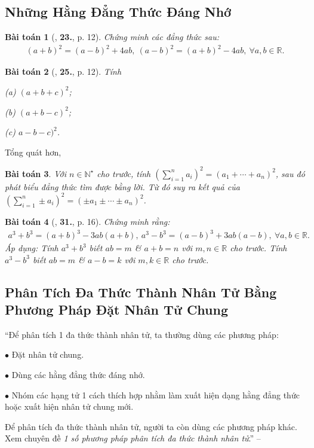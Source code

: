 \documentclass{article}
\numberwithin{equation}{section}
\newtheorem{baitoan}{Bài toán}[section]
\begin{document}

\subsection{Những Hằng Đẳng Thức Đáng Nhớ}
\begin{baitoan}[\cite{SGK_Toan_8_tap_1}, \textbf{23.}, p. 12]
	Chứng minh các đẳng thức sau:
	\begin{align*}
		(a + b)^2 = (a - b)^2 + 4ab,\ (a - b)^2 = (a + b)^2 - 4ab,\ \forall a,b\in\mathbb{R}.
	\end{align*}
\end{baitoan}

\begin{baitoan}[\cite{SGK_Toan_8_tap_1}, \textbf{25.}, p. 12]
	Tính
	\begin{enumerate*}
		\item[(a)] $(a + b + c)^2$;
		\item[(b)] $(a + b - c)^2$;
		\item[(c)] $a - b - c)^2$.
	\end{enumerate*}
\end{baitoan}
Tổng quát hơn,
\begin{baitoan}
	Với $n\in\mathbb{N}^\star$ cho trước, tính $\left(\sum_{i=1}^n a_i\right)^2 = (a_1 + \cdots + a_n)^2$, sau đó phát biểu đẳng thức tìm được bằng lời. Từ đó suy ra kết quả của $\left(\sum_{i=1}^n \pm a_i\right)^2 = (\pm a_1\pm\cdots\pm a_n)^2$.
\end{baitoan}

\begin{baitoan}[\cite{SGK_Toan_8_tap_1}, \textbf{31.}, p. 16]
	Chứng minh rằng:
	\begin{align*}
		a^3 + b^3 = (a + b)^3 - 3ab(a + b),\ a^3 - b^3 = (a - b)^3 + 3ab(a - b),\ \forall a,b\in\mathbb{R}.
	\end{align*}
	Áp dụng: Tính $a^3 + b^3$ biết $ab = m$ \& $a + b = n$ với $m,n\in\mathbb{R}$ cho trước. Tính $a^3 - b^3$ biết $ab = m$ \& $a - b = k$ với $m,k\in\mathbb{R}$ cho trước.
\end{baitoan}


\newpage
\subsection{Phân Tích Đa Thức Thành Nhân Tử Bằng Phương Pháp Đặt Nhân Tử Chung}
``Để phân tích 1 đa thức thành nhân tử, ta thường dùng các phương pháp:
\begin{enumerate*}
	\item[$\bullet$] Đặt nhân tử chung.
	\item[$\bullet$] Dùng các hằng đẳng thức đáng nhớ.
	\item[$\bullet$] Nhóm các hạng tử 1 cách thích hợp nhằm làm xuất hiện dạng hằng đẳng thức hoặc xuất hiện nhân tử chung mới.
\end{enumerate*}
Để phân tích đa thức thành nhân tử, người ta còn dùng các phương pháp khác. Xem chuyên đề \textit{1 số phương pháp phân tích đa thức thành nhân tử}.'' -- \cite[p. 15]{Binh_Toan_8_tap_1}
\end{document}
